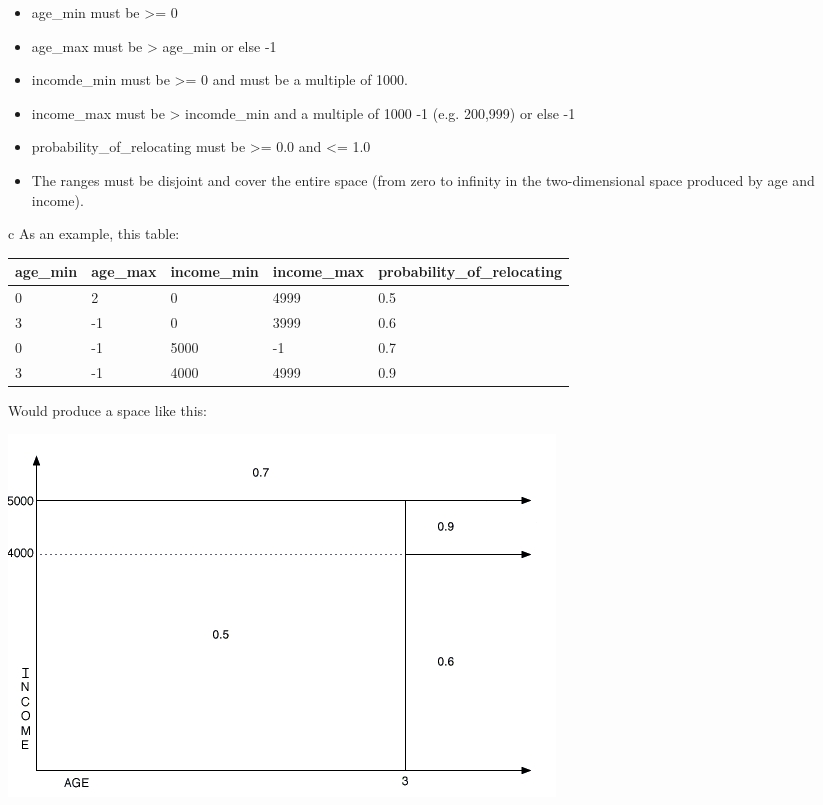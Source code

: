 \begin{itemize} \tight
\item age_min must be \textgreater{}= 0
\item age_max must be \textgreater{} age_min or else -1
\item incomde_min must be \textgreater{}= 0 and must be a multiple of 1000.
\item income_max must be \textgreater{} incomde_min and a multiple of 1000 -1
(e.g. 200,999) or else -1
\item probability_of_relocating must be \textgreater{}= 0.0 and \textless{}= 1.0
\item The ranges must be disjoint and cover the entire space (from zero to
infinity in the two-dimensional space produced by age and income).

\end{itemize}
\begin{center}

\pagebreak
\begin{tabular}{c}
As an example, this table:


\begin{tabular}{|l|l|l|l|l|}
\hline
age_min &age_max &income_min &income_max &probability_of_relocating \\
\hline
0 &2 &0 &4999 &0.5 \\
\hline
3 &-1 &0 &3999 &0.6 \\
\hline
0 &-1 &5000 &-1 &0.7 \\
\hline
3 &-1 &4000 &4999 &0.9 \\
\hline

\end{tabular}

\end{tabular}

\end{center}

Would produce a space like this:\\

\begin{center}
\includegraphics*{ARRFHouseholdsExample}
\end{center}




